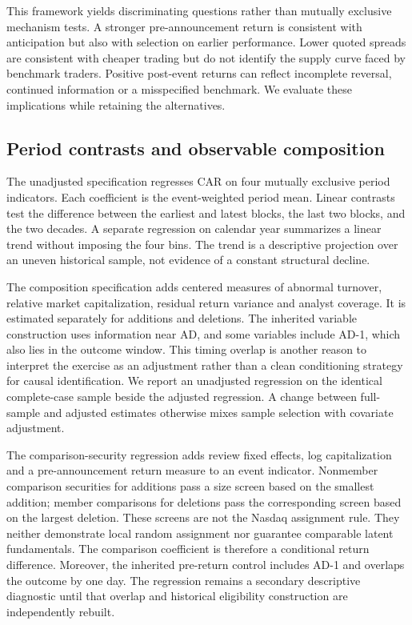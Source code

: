 This framework yields discriminating questions rather than mutually exclusive mechanism tests. A stronger pre-announcement return is consistent with anticipation but also with selection on earlier performance. Lower quoted spreads are consistent with cheaper trading but do not identify the supply curve faced by benchmark traders. Positive post-event returns can reflect incomplete reversal, continued information or a misspecified benchmark. We evaluate these implications while retaining the alternatives.

\subsection{Period contrasts and observable composition}

The unadjusted specification regresses CAR on four mutually exclusive period indicators. Each coefficient is the event-weighted period mean. Linear contrasts test the difference between the earliest and latest blocks, the last two blocks, and the two decades. A separate regression on calendar year summarizes a linear trend without imposing the four bins. The trend is a descriptive projection over an uneven historical sample, not evidence of a constant structural decline.

The composition specification adds centered measures of abnormal turnover, relative market capitalization, residual return variance and analyst coverage. It is estimated separately for additions and deletions. The inherited variable construction uses information near AD, and some variables include AD-1, which also lies in the outcome window. This timing overlap is another reason to interpret the exercise as an adjustment rather than a clean conditioning strategy for causal identification. We report an unadjusted regression on the identical complete-case sample beside the adjusted regression. A change between full-sample and adjusted estimates otherwise mixes sample selection with covariate adjustment.

The comparison-security regression adds review fixed effects, log capitalization and a pre-announcement return measure to an event indicator. Nonmember comparison securities for additions pass a size screen based on the smallest addition; member comparisons for deletions pass the corresponding screen based on the largest deletion. These screens are not the Nasdaq assignment rule. They neither demonstrate local random assignment nor guarantee comparable latent fundamentals. The comparison coefficient is therefore a conditional return difference. Moreover, the inherited pre-return control includes AD-1 and overlaps the outcome by one day. The regression remains a secondary descriptive diagnostic until that overlap and historical eligibility construction are independently rebuilt.

